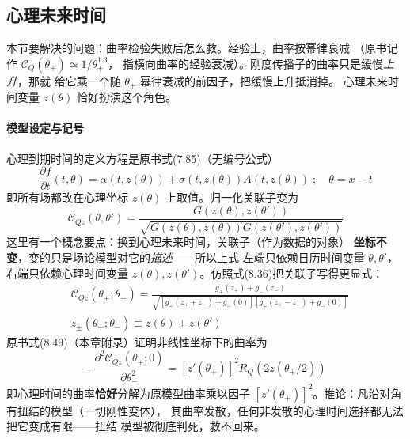\subsection{心理未来时间}

本节要解决的问题：曲率检验失败后怎么救。经验上，曲率按幂律衰减
（原书记作 $\mathcal{C}_{Q}(\theta_{+})\simeq1/\theta_{+}^{1.3}$，
指横向曲率的经验衰减）。刚度传播子的曲率只是缓慢\emph{上升}，那就
给它乘一个随 $\theta_{+}$ 幂律衰减的前因子，把缓慢上升抵消掉。
心理未来时间变量 $z(\theta)$ 恰好扮演这个角色。

\paragraph{模型设定与记号}
心理到期时间的定义方程是原书式(7.85)（无编号公式）
\begin{equation*}
\frac{\partial f}{\partial t}(t,\theta)=\alpha(t,z(\theta))
+\sigma(t,z(\theta))A(t,z(\theta))\;;\quad\theta=x-t
\end{equation*}
即所有场都改在心理坐标 $z(\theta)$ 上取值。归一化关联子变为
\begin{equation*}
\mathcal{C}_{Qz}(\theta,\theta')=
\frac{G(z(\theta),z(\theta'))}
{\sqrt{G(z(\theta),z(\theta))G(z(\theta'),z(\theta'))}}
\tag{8.40}
\end{equation*}
这里有一个概念要点：换到心理未来时间，关联子（作为数据的对象）
\textbf{坐标不变}，变的只是场论模型对它的\emph{描述}——所以上式
左端只依赖日历时间变量 $\theta,\theta'$，右端只依赖心理时间变量
$z(\theta),z(\theta')$。仿照式(8.36)把关联子写得更显式：
\begin{align*}
&\mathcal{C}_{Qz}(\theta_{+};\theta_{-})=
\frac{g_{+}(z_{+})+g_{-}(z_{-})}
{\sqrt{\left[g_{+}(z_{+}+z_{-})+g_{-}(0)\right]
\left[g_{+}(z_{+}-z_{-})+g_{-}(0)\right]}}
\tag{8.41}\\
&z_{\pm}(\theta_{+};\theta_{-})\equiv z(\theta)\pm z(\theta')
\tag{8.42}
\end{align*}
原书式(8.49)（本章附录）证明非线性坐标下的曲率为
\begin{equation*}
-\frac{\partial^{2}\mathcal{C}_{Qz}(\theta_{+};0)}{\partial\theta_{-}^{2}}
=\left[z'(\theta_{+})\right]^{2}R_{Q}\!\left(2z(\theta_{+}/2)\right)
\tag{8.43}
\end{equation*}
即心理时间的曲率\textbf{恰好}分解为原模型曲率乘以因子
$[z'(\theta_{+})]^{2}$。推论：凡沿对角有扭结的模型（一切刚性变体），
其曲率发散，任何非发散的心理时间选择都无法把它变成有限——扭结
模型被彻底判死，救不回来。

